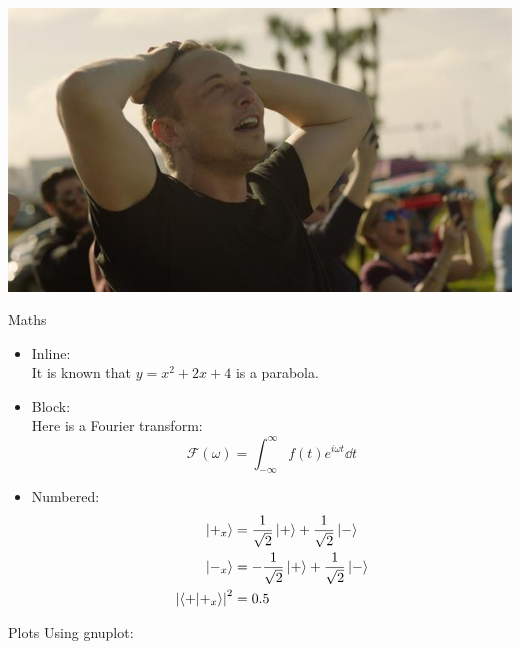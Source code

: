 \documentclass[10pt]{beamer}
\begin{document}
\begin{frame}
\centering
    \includegraphics[width=\textwidth]{oohyeah}
\end{frame}
\begin{frame}{Maths}
\begin{itemize}
    \item Inline:\\
    It is known that $y=x^2+2x+4$ is a parabola.\par
    \item Block:\\
    Here is a Fourier transform:
    \[\mathcal{F}\left(\omega\right)=\int_{-\infty}^\infty f(t) e^{i\omega t}\dd t\]
    \item Numbered:
    \begin{subequations}
    \begin{align}
        \ket{+_x} &= \frac{1}{\sqrt{2}} \ket{+} + \frac{1}{\sqrt{2}} \ket{-}\\
        \ket{-_x} &= -\frac{1}{\sqrt{2}} \ket{+} + \frac{1}{\sqrt{2}} \ket{-}\\
        \abs{\braket{+}{+_x}}^2 &= 0.5
    \end{align}
    \end{subequations}
\end{itemize}

\end{frame}
\begin{frame}{Plots}
Using gnuplot:
\begin{figure}
\centering
{}
\end{figure}
\end{frame}
\end{document}
